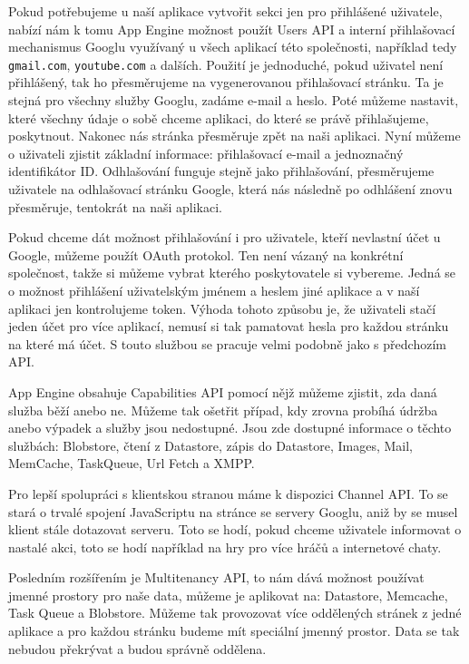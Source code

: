 Pokud potřebujeme u naší aplikace vytvořit sekci jen pro přihlášené uživatele, nabízí nám k tomu App Engine možnost použít Users API a interní přihlašovací mechanismus Googlu využívaný u všech aplikací této společnosti, například tedy \verb|gmail.com|, \verb|youtube.com| a dalších. Použití je jednoduché, pokud uživatel není přihlášený, tak ho přesměrujeme na vygenerovanou přihlašovací stránku. Ta je stejná pro všechny služby Googlu, zadáme e-mail a heslo. Poté můžeme nastavit, které všechny údaje o sobě chceme aplikaci, do které se právě přihlašujeme, poskytnout. Nakonec nás stránka přesměruje zpět na naši aplikaci. Nyní můžeme o uživateli zjistit základní informace: přihlašovací e-mail a jednoznačný identifikátor ID. Odhlašování funguje stejně jako přihlašování, přesměrujeme uživatele na odhlašovací stránku Google, která nás následně po odhlášení znovu přesměruje, tentokrát na naši aplikaci.

Pokud chceme dát možnost přihlašování i pro uživatele, kteří nevlastní účet u Google, můžeme použít OAuth protokol. Ten není vázaný na konkrétní společnost, takže si můžeme vybrat kterého poskytovatele si vybereme. Jedná se o možnost přihlášení uživatelským jménem a heslem jiné aplikace a v naší aplikaci jen kontrolujeme token. Výhoda tohoto způsobu je, že uživateli stačí jeden účet pro více aplikací, nemusí si tak pamatovat hesla pro každou stránku na které má účet. S touto službou se pracuje velmi podobně jako s předchozím API.

App Engine obsahuje Capabilities API pomocí nějž můžeme zjistit, zda daná služba běží anebo ne. Můžeme tak ošetřit případ, kdy zrovna probíhá údržba anebo výpadek a služby jsou nedostupné. Jsou zde dostupné informace o těchto službách: Blobstore, čtení z Datastore, zápis do Datastore, Images, Mail, MemCache, TaskQueue, Url Fetch a XMPP.

Pro lepší spolupráci s klientskou stranou máme k dispozici Channel API. To se stará o trvalé spojení JavaScriptu na stránce se servery Googlu, aniž by se musel klient stále dotazovat serveru. Toto se hodí, pokud chceme uživatele informovat o nastalé akci, toto se hodí například na hry pro více hráčů a internetové chaty.

Posledním rozšířením je Multitenancy API, to nám dává možnost používat jmenné prostory pro naše data, můžeme je aplikovat na: Datastore, Memcache, Task Queue a Blobstore. Můžeme tak provozovat více oddělených stránek z jedné aplikace a pro každou stránku budeme mít speciální jmenný prostor. Data se tak nebudou překrývat a budou správně oddělena.

